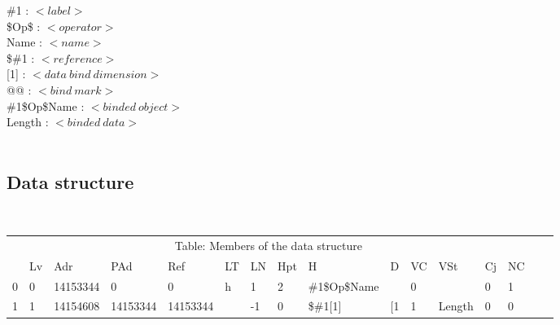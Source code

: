 {\begin{minipage}[t]{242mm}
\color{red}\#1 : $<label>$ \vspace{2mm}\\
\color{blue}\$Op\$ : $<operator>$ \vspace{2mm}\\
\color{green}Name : $<name>$ \vspace{2mm}\\
\color{magenta}\$\#1 : $<reference>$ \vspace{2mm}\\
\color{cyan}[1] : $<data \ bind \ dimension>$ \vspace{2mm}\\
\color{black}@@ : $<bind \ mark>$ \vspace{2mm}\\
\color{brown}\#1\$Op\$Name : $<binded \ object>$ \vspace{2mm}\\
\color{purple}Length : $<binded \ data>$\\
\\
\vspace{-30mm}
\color{black}\subsection*{\fontsize{40}{20}\selectfont Data structure} \vspace{0mm}
\ 
\\
\linespread{1.2}\fontsize{16}{20}\sffamily\selectfont
\begin{tabular}{llllllllllllllll}
\multicolumn{14}{c}{\fontsize{28}{20}\sffamily\selectfont Table: Members of the data structure}\\
&Lv&Adr&PAd&Ref&LT&LN&Hpt&H&D&VC&VSt&Cj&NC\\
\hline
0&0&14153344&0&0&h&1&2&\#1\$Op\$Name&&0&&0&1\\
1&1&14154608&14153344&14153344&&-1&0&\$\#1[1]&[1&1&Length&0&0\\
\end{tabular}
\vspace{5mm}
\end{minipage} }
